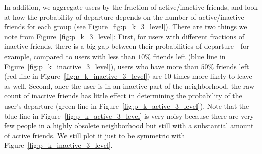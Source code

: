 \documentclass[phd,tocprelim]{cornell}
\begin{document}
In addition, we aggregate users by the fraction of active/inactive friends, and look at how the probability of departure depends on the number of active/inactive friends for each group (see Figure~\ref{fig:p_k_3_level}). There are two things we note from Figure~\ref{fig:p_k_3_level}: First, for users with different fractions of inactive friends, there is a big gap between their probabilities of departure - for example, compared to users with less than $10\%$ friends left (blue line in Figure~\ref{fig:p_k_inactive_3_level}), users who have more than $50\%$ friends left (red line in Figure~\ref{fig:p_k_inactive_3_level}) are $10$ times more likely to leave as well. Second, once the user is in an inactive part of the neighborhood, the raw count of inactive friends has little effect in determining the probability of the user's departure (green line in Figure~\ref{fig:p_k_active_3_level}). Note that the blue line in Figure~\ref{fig:p_k_active_3_level} is very noisy because there are very few people in a highly obsolete neighborhood but still with a substantial amount of active friends. We still plot it just to be symmetric with Figure~\ref{fig:p_k_inactive_3_level}.
\end{document}
